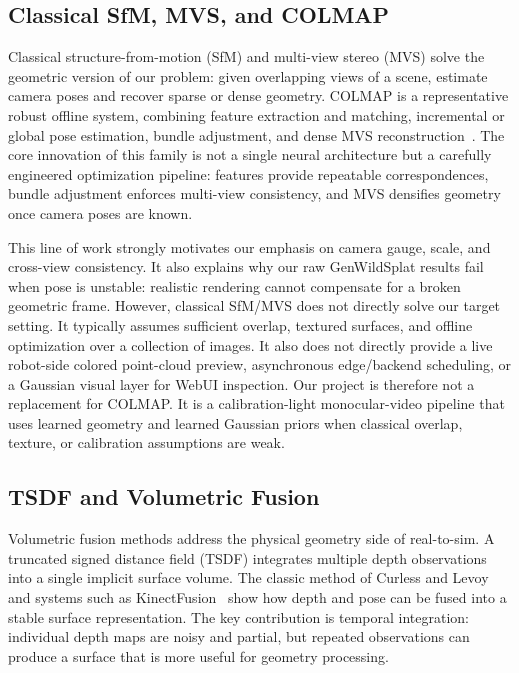 \documentclass[11pt]{article}
\begin{document}
\subsection{Classical SfM, MVS, and COLMAP}

Classical structure-from-motion (SfM) and multi-view stereo (MVS) solve the geometric version of our problem: given overlapping views of a scene, estimate camera poses and recover sparse or dense geometry. COLMAP is a representative robust offline system, combining feature extraction and matching, incremental or global pose estimation, bundle adjustment, and dense MVS reconstruction~\cite{schoenberger2016sfm,schoenberger2016mvs}. The core innovation of this family is not a single neural architecture but a carefully engineered optimization pipeline: features provide repeatable correspondences, bundle adjustment enforces multi-view consistency, and MVS densifies geometry once camera poses are known.

This line of work strongly motivates our emphasis on camera gauge, scale, and cross-view consistency. It also explains why our raw GenWildSplat results fail when pose is unstable: realistic rendering cannot compensate for a broken geometric frame. However, classical SfM/MVS does not directly solve our target setting. It typically assumes sufficient overlap, textured surfaces, and offline optimization over a collection of images. It also does not directly provide a live robot-side colored point-cloud preview, asynchronous edge/backend scheduling, or a Gaussian visual layer for WebUI inspection. Our project is therefore not a replacement for COLMAP. It is a calibration-light monocular-video pipeline that uses learned geometry and learned Gaussian priors when classical overlap, texture, or calibration assumptions are weak.

\subsection{TSDF and Volumetric Fusion}

Volumetric fusion methods address the physical geometry side of real-to-sim. A truncated signed distance field (TSDF) integrates multiple depth observations into a single implicit surface volume. The classic method of Curless and Levoy~\cite{curless1996volumetric} and systems such as KinectFusion~\cite{newcombe2011kinectfusion} show how depth and pose can be fused into a stable surface representation. The key contribution is temporal integration: individual depth maps are noisy and partial, but repeated observations can produce a surface that is more useful for geometry processing.
\end{document}
